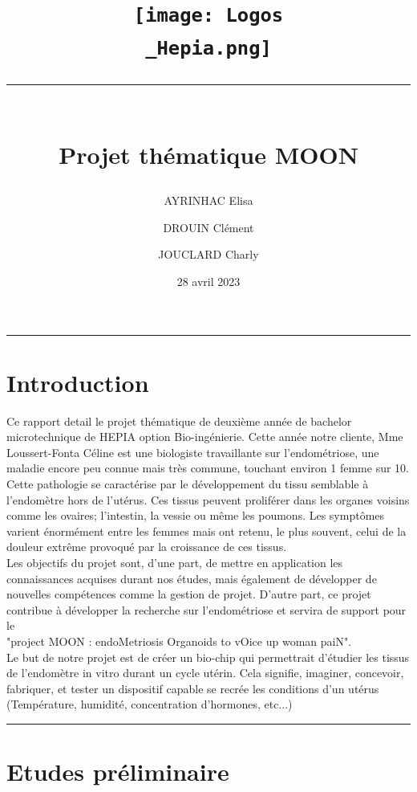 \documentclass[a4paper, 11pt]{article}
\title{
    \vspace{-2.5cm}
    \centering\texttt{[image: Logos\\\_Hepia.png]}\\
    \centering\rule{17cm}{0.1mm}\vspace*{0.4in}\\
    \centering Projet thématique MOON}
\author[1]{AYRINHAC Elisa}
\author[2]{DROUIN Clément}
\author[3]{JOUCLARD Charly}
\affil[1]{HEPIA, MT2, elisa.ayrinhac@hes-so.ch}
\affil[2]{HEPIA, MT2, clement.drouin@hes-so.ch}
\affil[3]{HEPIA, MT2, charly.jouclard@hes-so.ch}
\date{28 avril 2023}
\begin{document}
\maketitle
\thispagestyle{empty}
\begin{center}
    \rule{\textwidth}{0.1mm}
\end{center}
\vspace{-1cm}
\section*{Introduction}
Ce rapport detail le projet thématique de deuxième année de bachelor
microtechnique de HEPIA option Bio-ingénierie.
Cette année notre cliente, Mme Loussert-Fonta Céline est une biologiste travaillante
sur l'endométriose, une maladie encore
peu connue mais très commune, touchant environ 1 femme sur 10.\\
Cette pathologie se caractérise par le développement du tissu semblable
à l'endomètre hors de l'utérus.
Ces tissus peuvent proliférer dans les organes voisins comme les ovaires;
l'intestin, la vessie ou même les poumons.
Les symptômes varient énormément entre les femmes mais ont retenu, le
plus souvent, celui de la douleur
extrême provoqué par la croissance de ces tissus.\\
Les objectifs du projet sont, d'une part, de mettre en application les
connaissances acquises durant nos études, mais également de développer de
nouvelles compétences comme la gestion de projet.
D'autre part, ce projet contribue à développer la recherche sur
l'endométriose et servira de support pour le \\
"project MOON : endoMetriosis Organoids to vOice up woman paiN".\\
Le but de notre projet est de créer un bio-chip qui permettrait d'étudier
les tissus de l'endomètre in vitro durant un cycle utérin. Cela signifie, imaginer, concevoir, fabriquer,
et tester un dispositif capable se recrée
les conditions d'un utérus (Température, humidité, concentration d'hormones, etc...)
\vspace{1cm}
\maketitle
\thispagestyle{empty}
\begin{center}
    \rule{\textwidth}{0.1mm}
\end{center}
\newpage
\tableofcontents
\newpage
\section{Etudes préliminaire}
\end{document}
